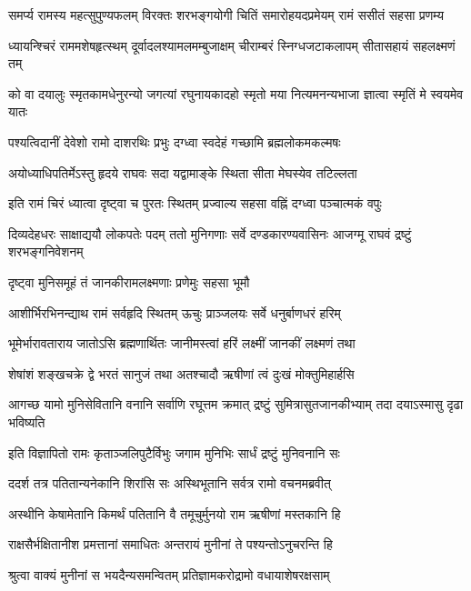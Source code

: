 \fourlineindentedshloka
{समर्प्य रामस्य महत्सुपुण्यफलम्}
{विरक्तः शरभङ्गयोगी}
{चितिं समारोहयदप्रमेयम्}
{रामं ससीतं सहसा प्रणम्य} %

\fourlineindentedshloka
{ध्यायन्श्चिरं राममशेषहृत्स्थम्}
{दूर्वादलश्यामलमम्बुजाक्षम्}
{चीराम्बरं स्निग्धजटाकलापम्}
{सीतासहायं सहलक्ष्मणं तम्} %

\fourlineindentedshloka
{को वा दयालुः स्मृतकामधेनुरन्यो}
{जगत्यां रघुनायकादहो}
{स्मृतो मया नित्यमनन्यभाजा}
{ज्ञात्वा स्मृतिं मे स्वयमेव यातः} %

\twolineshloka
{पश्यत्विदानीं देवेशो रामो दाशरथिः प्रभुः}
{दग्ध्वा स्वदेहं गच्छामि ब्रह्मलोकमकल्मषः} %

\twolineshloka
{अयोध्याधिपतिर्मेऽस्तु हृदये राघवः सदा}
{यद्वामाङ्के स्थिता सीता मेघस्येव तटिल्लता} %

\twolineshloka
{इति रामं चिरं ध्यात्वा दृष्ट्वा च पुरतः स्थितम्}
{प्रज्वाल्य सहसा वह्निं दग्ध्वा पञ्चात्मकं वपुः} %

\threelineshloka
{दिव्यदेहधरः साक्षाद्ययौ लोकपतेः पदम्}
{ततो मुनिगणाः सर्वे दण्डकारण्यवासिनः}
{आजग्मू राघवं द्रष्टुं शरभङ्गनिवेशनम्} %

\twolineshloka
{दृष्ट्वा मुनिसमूहं तं जानकीरामलक्ष्मणाः}
{प्रणेमुः सहसा भूमौ} %

\twolineshloka
{आशीर्भिरभिनन्द्याथ रामं सर्वहृदि स्थितम्}
{ऊचुः प्राञ्जलयः सर्वे धनुर्बाणधरं हरिम्} %

\twolineshloka
{भूमेर्भारावताराय जातोऽसि ब्रह्मणार्थितः}
{जानीमस्त्वां हरिं लक्ष्मीं जानकीं लक्ष्मणं तथा} %

\twolineshloka
{शेषांशं शङ्खचक्रे द्वे भरतं सानुजं तथा}
{अतश्चादौ ऋषीणां त्वं दुःखं मोक्तुमिहार्हसि} %

\fourlineindentedshloka
{आगच्छ यामो मुनिसेवितानि}
{वनानि सर्वाणि रघूत्तम क्रमात्}
{द्रष्टुं सुमित्रासुतजानकीभ्याम्}
{तदा दयाऽस्मासु दृढा भविष्यति} %

\twolineshloka
{इति विज्ञापितो रामः कृताञ्जलिपुटैर्विभुः}
{जगाम मुनिभिः सार्धं द्रष्टुं मुनिवनानि सः} %

\twolineshloka
{ददर्श तत्र पतितान्यनेकानि शिरांसि सः}
{अस्थिभूतानि सर्वत्र रामो वचनमब्रवीत्} %

\twolineshloka
{अस्थीनि केषामेतानि किमर्थं पतितानि वै}
{तमूचुर्मुनयो राम ऋषीणां मस्तकानि हि} %

\twolineshloka
{राक्षसैर्भक्षितानीश प्रमत्तानां समाधितः}
{अन्तरायं मुनीनां ते पश्यन्तोऽनुचरन्ति हि} %

\twolineshloka
{श्रुत्वा वाक्यं मुनीनां स भयदैन्यसमन्वितम्}
{प्रतिज्ञामकरोद्रामो वधायाशेषरक्षसाम्} %

